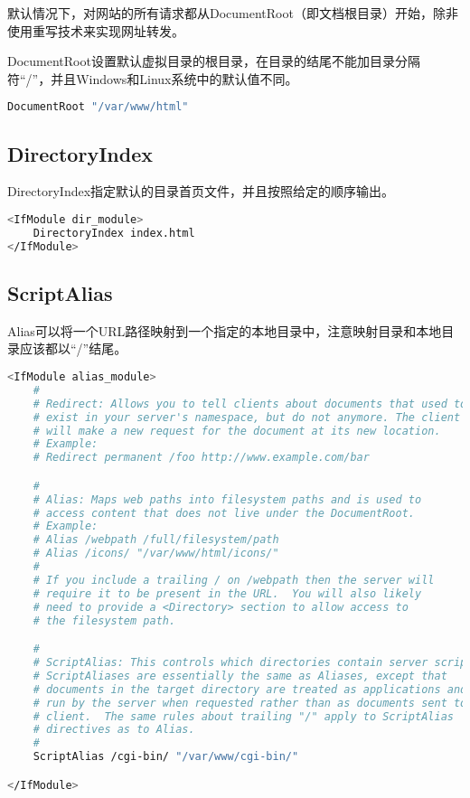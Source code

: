 默认情况下，对网站的所有请求都从DocumentRoot（即文档根目录）开始，除非使用重写技术来实现网址转发。

DocumentRoot设置默认虚拟目录的根目录，在目录的结尾不能加目录分隔符“/”，并且Windows和Linux系统中的默认值不同。

\begin{lstlisting}[language=bash]
DocumentRoot "/var/www/html"
\end{lstlisting}


\subsection{DirectoryIndex}

DirectoryIndex指定默认的目录首页文件，并且按照给定的顺序输出。



\begin{lstlisting}[language=bash]
<IfModule dir_module>
    DirectoryIndex index.html
</IfModule>
\end{lstlisting}

\subsection{ScriptAlias}

Alias可以将一个URL路径映射到一个指定的本地目录中，注意映射目录和本地目录应该都以“/”结尾。




\begin{lstlisting}[language=bash]
<IfModule alias_module>
    #
    # Redirect: Allows you to tell clients about documents that used to 
    # exist in your server's namespace, but do not anymore. The client 
    # will make a new request for the document at its new location.
    # Example:
    # Redirect permanent /foo http://www.example.com/bar

    #
    # Alias: Maps web paths into filesystem paths and is used to
    # access content that does not live under the DocumentRoot.
    # Example:
    # Alias /webpath /full/filesystem/path
    # Alias /icons/ "/var/www/html/icons/"
    #
    # If you include a trailing / on /webpath then the server will
    # require it to be present in the URL.  You will also likely
    # need to provide a <Directory> section to allow access to
    # the filesystem path.

    #
    # ScriptAlias: This controls which directories contain server scripts. 
    # ScriptAliases are essentially the same as Aliases, except that
    # documents in the target directory are treated as applications and
    # run by the server when requested rather than as documents sent to the
    # client.  The same rules about trailing "/" apply to ScriptAlias
    # directives as to Alias.
    #
    ScriptAlias /cgi-bin/ "/var/www/cgi-bin/"

</IfModule>
\end{lstlisting}

